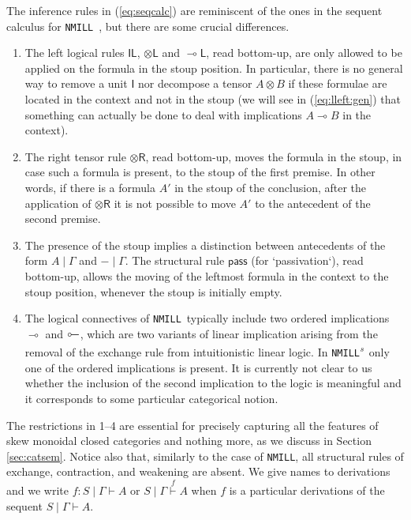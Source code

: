 \documentclass[submission,copyright,creativecommons]{eptcs}
\theoremstyle{definition}
\newcommand{\tl}{\otimes \mathsf{L}}
\newcommand{\tr}{\otimes \mathsf{R}}
\newcommand{\lleft}{{\multimap}\mathsf{L}}
\newcommand{\pass}{\mathsf{pass}}
\newcommand{\unitl}{\mathsf{IL}}
\newcommand{\ot}{\otimes}
\newcommand{\lolli}{\multimap}
\newcommand{\illol}{\rotatebox[origin=c]{180}{$\multimap$}}
\newcommand{\I}{\mathsf{I}}
\newcommand{\NMILL}{\texttt{NMILL}}
\newcommand{\SkNMILL}{\NMILL\textsuperscript{\textit{s}}}
\begin{document}
The inference rules in (\ref{eq:seqcalc}) are reminiscent of the ones in the sequent calculus for \NMILL\ \cite{abrusci:noncommutative:1990}, but there are some crucial differences.
\begin{enumerate}
\item The left logical rules $\unitl$, $\tl$ and $\lleft$, read bottom-up, are only allowed to be applied on the formula in the stoup position. In particular, there is no general way to remove a unit $\I$ nor decompose a tensor $A \ot B$ if these formulae are located in the context and not in the stoup (we will see in (\ref{eq:lleft:gen}) that something can actually be done to deal with implications $A \lolli B$ in the context).
\item The right tensor rule $\tr$, read bottom-up, moves the formula in the stoup, in case such a formula is present, to the stoup of the first premise. In other words, if there is a formula $A'$ in the stoup of the conclusion, after the application of $\tr$ it is not possible to move $A'$ to the antecedent of the second premise.
\item The presence of the stoup implies a distinction between antecedents of the form $A \mid \Gamma$ and $- \mid \Gamma$. The structural rule $\pass$ (for `passivation`), read bottom-up, allows the moving of the leftmost formula in the context to the stoup position, whenever the stoup is initially empty.
\item The logical connectives of \NMILL\ typically include two ordered implications $\lolli$ and $\illol$, which are two variants of linear implication arising from the removal of the exchange rule from intuitionistic linear logic. In \SkNMILL\ only one of the ordered implications is present. It is currently not clear to us whether the inclusion of the second implication to the logic is meaningful and it corresponds to some particular categorical notion.
\end{enumerate}
The restrictions in 1--4 are essential for precisely capturing all the features of skew monoidal closed categories and nothing more, as we discuss in Section \ref{sec:catsem}.
Notice also that, similarly to the case of \NMILL, all structural rules of exchange, contraction, and weakening are absent. We give names to derivations and we write $f : S \mid \Gamma \vdash A$ or $S \mid \Gamma \stackrel{f}{\vdash} A$ when $f$ is a particular derivations of the sequent $S \mid \Gamma \vdash A$.
\end{document}
